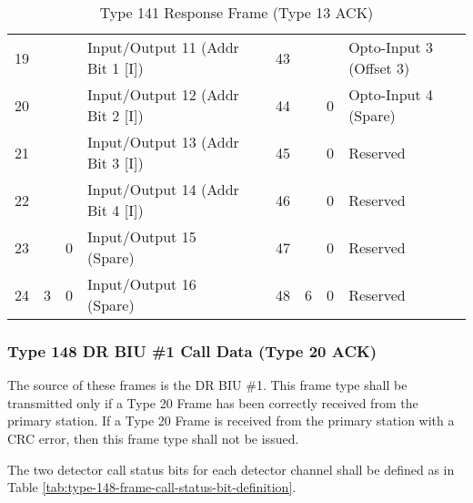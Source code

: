 \documentclass[]{article}
\begin{document}
\begin{landscape}
\begin{table}[]
\begin{tabular}{lllllllll}
			19           &                     &                & Input/Output 11 (Addr Bit 1 {[}I{]})            &                    & 43           &                     &                & Opto-Input 3 (Offset 3)                            \\ \cline{8-9} 
			20           &                     &                & Input/Output 12 (Addr Bit 2 {[}I{]})            &                    & 44           &                     & 0              & \cellcolor[HTML]{EFEFEF}Opto-Input 4 (Spare)       \\ \cline{8-9} 
			21           &                     &                & Input/Output 13 (Addr Bit 3 {[}I{]})            &                    & 45           &                     & 0              & Reserved                                           \\
			22           &                     &                & Input/Output 14 (Addr Bit 4 {[}I{]})            &                    & 46           &                     & 0              & Reserved                                           \\ \cline{3-4}
			23           &                     & 0              & \cellcolor[HTML]{EFEFEF}Input/Output 15 (Spare) &                    & 47           &                     & 0              & Reserved                                           \\
			24           & \multirow{-8}{*}{3} & 0              & \cellcolor[HTML]{EFEFEF}Input/Output 16 (Spare) &                    & 48           & \multirow{-8}{*}{6} & 0              & Reserved                                           \\ \cline{1-4} \cline{6-9} 
		\end{tabular}
		\caption{Type 141 Response Frame (Type 13 ACK)}
		\label{tab:type-141-frame}
	\end{table}
\end{landscape}

\subsubsection {Type 148 DR BIU \#1 Call Data (Type 20 ACK)}

The source of these frames is the DR BIU \#1. This frame type shall be transmitted only if a Type 20 Frame has been correctly received from the primary station. If a Type 20 Frame is received from the primary station with a CRC error, then this frame type shall not be issued.

The two detector call status bits for each detector channel shall be defined as in Table \ref{tab:type-148-frame-call-status-bit-definition}.
\end{document}
